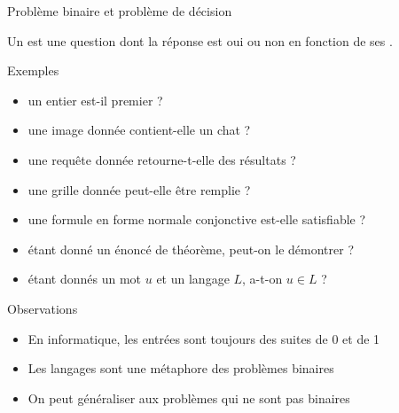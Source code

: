 
\begingroup

\begin{frame}{Problème binaire et problème de décision}
  
  Un  est une question dont la réponse est \alert{oui} ou \alert{non} en fonction de ses .
  
  \begin{exampleblock}{Exemples}
    \vspace{-2mm}
    \begin{itemize}
    \item {} un entier est-il premier ?  
    \item {} une image donnée contient-elle un chat ? 
    \item {} une requête donnée retourne-t-elle des résultats ?  
    \item {} une grille donnée peut-elle être remplie ? 
    \item {} une formule en forme normale conjonctive est-elle satisfiable ? 
    \item {} étant donné un énoncé de théorème, peut-on le démontrer ? 
    \item {} étant donnés un mot $u$ et un langage $L$, a-t-on $u\in L$ ? 
    \end{itemize}
  \end{exampleblock}
  \pause
  \begin{alertblock}{Observations}
    \vspace{-2mm}
    \begin{itemize}
    \item En informatique, les entrées sont toujours des suites de 0 et de 1
    \item \alert{Les langages sont une métaphore des problèmes binaires}
    \item On peut généraliser aux problèmes qui ne sont pas binaires
    \end{itemize}
  \end{alertblock}
  
\end{frame}

\endgroup
